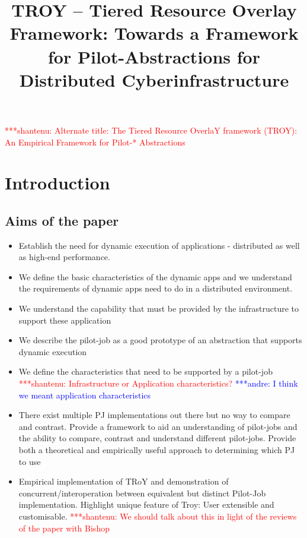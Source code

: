 \documentclass[]{article}
\title{TROY -- Tiered Resource Overlay Framework: Towards a Framework
  for Pilot-Abstractions for Distributed Cyberinfrastructure}
\author{  }
\newcommand{\jhanote}[1]{ {\textcolor{red} { ***shantenu: #1 }}}
\newcommand{\alnote}[1]{ {\textcolor{blue} { ***andre: #1 }}}
\newcommand{\alnote}[1]{}
\newcommand{\jhanote}[1]{}
\begin{document}
\ifpdf
{}
\else
{}
\fi

\maketitle

\jhanote{Alternate title: The Tiered Resource OverlaY framework
  (TROY): An Empirical Framework for Pilot-* Abstractions}


\begin{abstract}

\end{abstract}

\section{Introduction}
\subsection{Aims of the paper}
\begin{itemize}

\item Establish the need for dynamic execution of applications -
  distributed as well as high-end performance.

\item We define the basic characteristics of the dynamic apps and we
  understand the requirements of dynamic apps need to do in a
  distributed environment.

\item We understand the capability that must be provided by the
  infrastructure to support these application

\item We describe the pilot-job as a good prototype of an abstraction
  that supports dynamic execution

\item We define the characteristics that need to be supported by a
  pilot-job \jhanote{Infrastructure or Application characteristics?}
  \alnote{I think we meant application characteristics}

\item There exist multiple PJ implementations out there but no way to
  compare and contrast. Provide a framework to aid an understanding of
  pilot-jobs and the ability to compare, contrast and understand
  different pilot-jobs.  Provide both a theoretical and empirically
  useful approach to determining which PJ to use


\item Empirical implementation of TRoY and demonstration of
  concurrent/interoperation between equivalent but distinct Pilot-Job
  implementation. Highlight unique feature of Troy: User extensible
  and customisable. \jhanote{We should talk about this in light of the
    reviews of the paper with Bishop}
\end{itemize}
\end{document}
